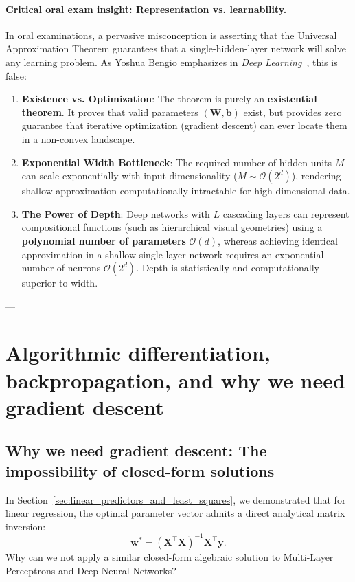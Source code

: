 \paragraph{Critical oral exam insight: Representation vs. learnability.}
In oral examinations, a pervasive misconception is asserting that the Universal Approximation Theorem guarantees that a single-hidden-layer network will solve any learning problem. As Yoshua Bengio emphasizes in \textit{Deep Learning}~\cite{goodfellow2016deep}, this is false:
\begin{enumerate}
  \item \textbf{Existence vs. Optimization}: The theorem is purely an \textbf{existential theorem}. It proves that valid parameters $(\mathbf{W}, \mathbf{b})$ exist, but provides zero guarantee that iterative optimization (gradient descent) can ever locate them in a non-convex landscape.
  \item \textbf{Exponential Width Bottleneck}: The required number of hidden units $M$ can scale exponentially with input dimensionality ($M \sim \mathcal{O}(2^d)$), rendering shallow approximation computationally intractable for high-dimensional data.
  \item \textbf{The Power of Depth}: Deep networks with $L$ cascading layers can represent compositional functions (such as hierarchical visual geometries) using a \textbf{polynomial number of parameters} $\mathcal{O}(d)$, whereas achieving identical approximation in a shallow single-layer network requires an exponential number of neurons $\mathcal{O}(2^d)$. Depth is statistically and computationally superior to width.
\end{enumerate}

---

\section{Algorithmic differentiation, backpropagation, and why we need gradient descent}
\label{sec:autodiff_backprop_gradient_descent}

\subsection{Why we need gradient descent: The impossibility of closed-form solutions}
\label{sec:why_we_need_gradient_descent}

In Section~\ref{sec:linear_predictors_and_least_squares}, we demonstrated that for linear regression, the optimal parameter vector admits a direct analytical matrix inversion:
\begin{equation}
\mathbf{w}^* = (\mathbf{X}^\top \mathbf{X})^{-1} \mathbf{X}^\top \mathbf{y}.
\end{equation}
Why can we not apply a similar closed-form algebraic solution to Multi-Layer Perceptrons and Deep Neural Networks?

